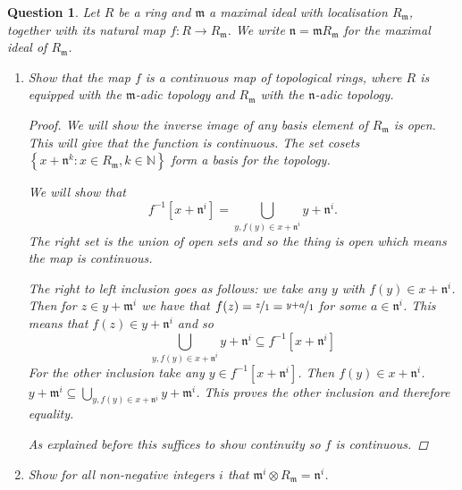 \documentclass{article}
\newcommand{\N}{\mathbb{N}}
\newcommand{\setwith}[2]{\left\{#1:#2\right\}}
\newcommand{\maxid}{\mathfrak{m}}
\newcommand{\maxidd}{\mathfrak{n}}
\newtheorem{question}{Question}
\theoremstyle{definition}
\begin{document}
\begin{question}
    Let \(R\) be a ring and \(\maxid\) a maximal ideal with localisation
    \(R_{\maxid}\), together with its natural map \(f:R\to R_{\maxid}\). We
    write \(\maxidd=\maxid R_{\maxid}\) for the maximal ideal of \(R_{\maxid}\).

    \begin{enumerate}[a]
        \item Show that the map \(f\) is a continuous map of topological rings,
              where \(R\) is equipped with the \(\maxid\)-adic topology and
              \(R_{\maxid}\) with the \(\maxidd\)-adic topology.


              \begin{proof}
                  We will show the inverse image of any basis element of
                  \(R_{\maxid}\) is open. This will give that the function is
                  continuous. The set cosets \(\setwith{x+\maxidd^{k}}{x\in
                      R_{\maxid},k\in\N}\) form a basis for the topology.

                  We will show that
                  \[
                      f^{-1}[x+\maxidd^{i}]=\bigcup_{y,f(y)\in x+\maxidd^{i}}y+\maxidd^{i}.
                  \]
                  The right set is the union of open sets and so the thing
                  is open which means the map is continuous.

                  The right to left inclusion goes as follows: we take any \(y\)
                  with \(f(y)\in x+\maxidd^{i}\). Then for \(z\in y+\maxid^{i}\)
                  we have that \(f(z)=\nicefrac{z}{1}=\nicefrac{y+a}{1}\) for
                  some \(a\in\maxidd^{i}\). This means that \(f(z)\in
                  y+\maxidd^{i}\) and so
                  \[
                      \bigcup_{y,f(y)\in x+\maxidd^{i}}y+\maxidd^{i}\subseteq f^{-1}[x+\maxidd^{i}]
                  \]
                  For the other inclusion take any \(y\in
                  f^{-1}[x+\maxidd^{i}]\). Then \(f(y)\in x+\maxidd^{i}\).
                  \(y+\maxid^{i}\subseteq\bigcup_{y,f(y)\in
                      x+\maxidd^{i}}y+\maxid^{i}\). This proves the other inclusion
                  and therefore equality.

                  As explained before this suffices to show continuity so \(f\)
                  is continuous.
              \end{proof}

        \item Show for all non-negative integers \(i\) that \(\maxid^{i}\otimes
              R_{\maxid}=\maxidd^{i}\).


\end{enumerate}
\end{question}
\end{document}
